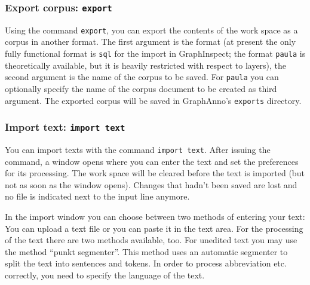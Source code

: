 \documentclass[12pt]{scrartcl}
\begin{document}
\subsubsection{Export corpus: \texttt{export}}\label{befehl-export}

Using the command \texttt{export}, you can export the contents of the work space as a corpus in another format.
The first argument is the format (at present the only fully functional format is \texttt{sql} for the import in GraphInspect; the format \texttt{paula} is theoretically available, but it is heavily restricted with respect to layers), the second argument is the name of the corpus to be saved.
For \texttt{paula} you can optionally specify the name of the corpus document to be created as third argument.
The exported corpus will be saved in GraphAnno’s \texttt{exports} directory.


\subsubsection{Import text: \texttt{import text}}

You can import texts with the command \texttt{import text}. After issuing the command, a window opens where you can enter the text and set the preferences for its processing.
The work space will be cleared before the text is imported (but not as soon as the window opens).
Changes that hadn’t been saved are lost and no file is indicated next to the input line anymore.

In the import window you can choose between two methods of entering your text:
You can upload a text file or you can paste it in the text area.
For the processing of the text there are two methods available, too.
For unedited text you may use the method “punkt segmenter”.
This method uses an automatic segmenter to split the text into sentences and tokens.
In order to process abbreviation etc. correctly, you need to specify the language of the text.
\end{document}
